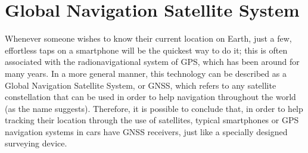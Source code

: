 









\section{Global Navigation Satellite System}\label{sec:II_gnss}

Whenever someone wishes to know their current location on Earth, just a few, effortless taps on a smartphone will be the quickest way to do it; this is often associated with the radionavigational system of GPS, which has been around for many years. In a more general manner, this technology can be described as a Global Navigation Satellite System, or GNSS, which refers to any satellite constellation that can be used in order to help navigation throughout the world (as the name suggests).
Therefore, it is possible to conclude that, in order to help tracking their location through the use of satellites, typical smartphones or GPS navigation systems in cars have GNSS receivers, just like a specially designed surveying device.

